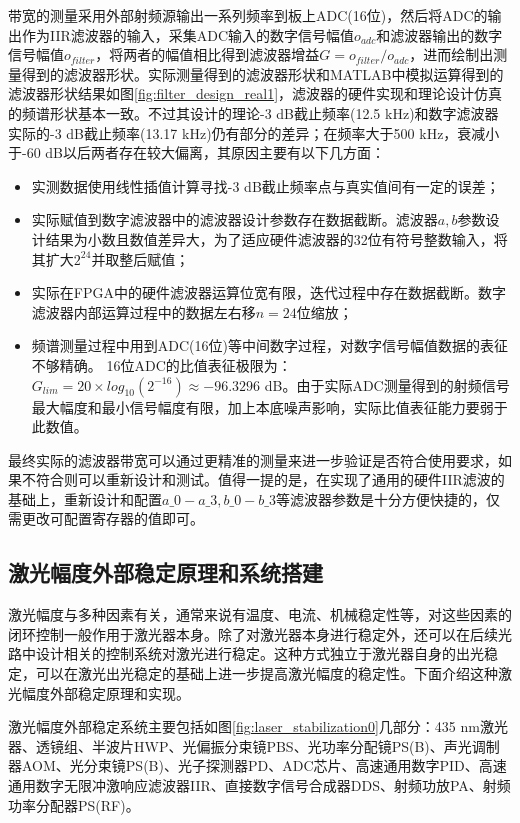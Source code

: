 带宽的测量采用外部射频源输出一系列频率到板上ADC(16位)，然后将ADC的输出作为IIR滤波器的输入，采集ADC输入的数字信号幅值$o_{adc}$和滤波器输出的数字信号幅值$o_{filter}$，将两者的幅值相比得到滤波器增益$G=o_{filter}/o_{adc}$，进而绘制出测量得到的滤波器形状。实际测量得到的滤波器形状和MATLAB中模拟运算得到的滤波器形状结果如图\ref{fig:filter_design_real1}，滤波器的硬件实现和理论设计仿真的频谱形状基本一致。不过其设计的理论-3 dB截止频率(12.5 kHz)和数字滤波器实际的-3 dB截止频率(13.17 kHz)仍有部分的差异；在频率大于500 kHz，衰减小于-60 dB以后两者存在较大偏离，其原因主要有以下几方面：
\begin{itemize}
    \item 实测数据使用线性插值计算寻找-3 dB截止频率点与真实值间有一定的误差；
    \item 实际赋值到数字滤波器中的滤波器设计参数存在数据截断。滤波器$a,b$参数设计结果为小数且数值差异大，为了适应硬件滤波器的32位有符号整数输入，将其扩大$2^{24}$并取整后赋值；
    \item 实际在FPGA中的硬件滤波器运算位宽有限，迭代过程中存在数据截断。数字滤波器内部运算过程中的数据左右移$n=24$位缩放；
    \item 频谱测量过程中用到ADC(16位)等中间数字过程，对数字信号幅值数据的表征不够精确。
    16位ADC的比值表征极限为：$G_{lim}=20\times log_{10}(2^{-16})\approx -96.3296$ dB。由于实际ADC测量得到的射频信号最大幅度和最小信号幅度有限，加上本底噪声影响，实际比值表征能力要弱于此数值。
\end{itemize}


最终实际的滤波器带宽可以通过更精准的测量来进一步验证是否符合使用要求，如果不符合则可以重新设计和测试。值得一提的是，在实现了通用的硬件IIR滤波的基础上，重新设计和配置$a\_0-a\_3, b\_0-b\_3$等滤波器参数是十分方便快捷的，仅需更改可配置寄存器的值即可。



\subsection[激光幅度外部稳定原理和系统搭建]{激光幅度外部稳定原理和系统搭建}
激光幅度与多种因素有关，通常来说有温度、电流、机械稳定性等，对这些因素的闭环控制一般作用于激光器本身。除了对激光器本身进行稳定外，还可以在后续光路中设计相关的控制系统对激光进行稳定。这种方式独立于激光器自身的出光稳定，可以在激光出光稳定的基础上进一步提高激光幅度的稳定性。下面介绍这种激光幅度外部稳定原理和实现。



激光幅度外部稳定系统主要包括如图\ref{fig:laser_stabilization0}几部分：435 nm激光器、透镜组、半波片HWP、光偏振分束镜PBS、光功率分配镜PS(B)、声光调制器AOM、光分束镜PS(B)、光子探测器PD、ADC芯片、高速通用数字PID、高速通用数字无限冲激响应滤波器IIR、直接数字信号合成器DDS、射频功放PA、射频功率分配器PS(RF)。


